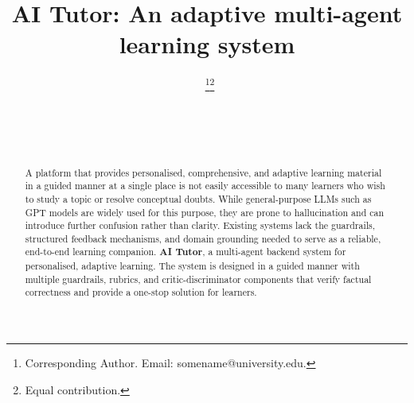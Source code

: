 \documentclass{ecai}
\begin{document}

\begin{frontmatter}




\title{AI Tutor: An adaptive multi-agent learning system}


\author[A]{~\thanks{Corresponding Author. Email: somename@university.edu.}\footnote{Equal contribution.}}
\author[B]{~\footnotemark}
\author[B,C]{~} 

\address[A]{Short Affiliation of First Author}
\address[B]{Short Affiliation of Second Author and Third Author}
\address[C]{Short Alternate Affiliation of Third Author}


\begin{abstract}
A platform that provides personalised, comprehensive, and adaptive
learning material in a guided manner at a single place is not easily
accessible to many learners who wish to study a topic or resolve
conceptual doubts. While general-purpose LLMs such as GPT models are
widely used for this purpose, they are prone to hallucination and can
introduce further confusion rather than clarity. Existing systems lack
the guardrails, structured feedback mechanisms, and domain grounding
needed to serve as a reliable, end-to-end learning companion.
\textbf{AI Tutor}, a multi-agent backend system for
personalised, adaptive learning. The system is designed in a guided
manner with multiple guardrails, rubrics, and critic-discriminator
components that verify factual correctness and provide a one-stop
solution for learners. 
\end{abstract}

\end{frontmatter}
\end{document}

